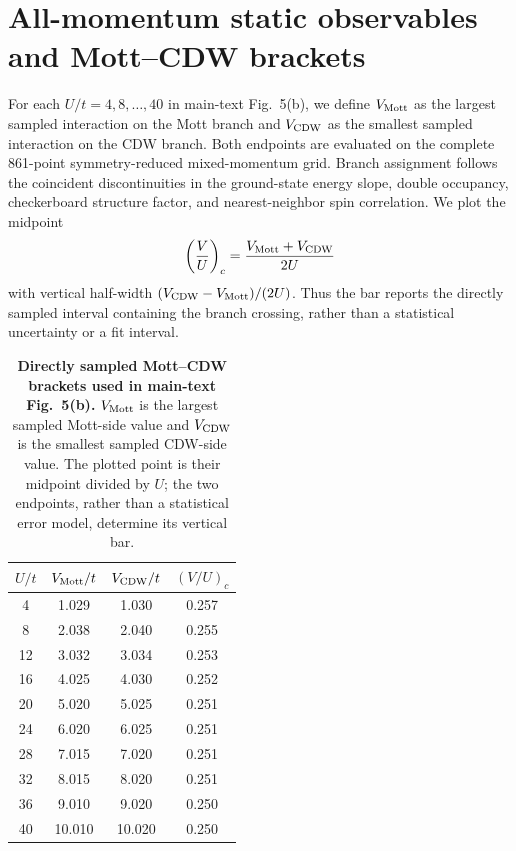 \documentclass[10pt]{article}
\begin{document}
\section{All-momentum static observables and Mott--CDW brackets}
For each $U/t=4,8,\ldots,40$ in main-text Fig.~5(b), we define $V_{\rm Mott}$ as the largest sampled interaction on the Mott branch and $V_{\rm CDW}$ as the smallest sampled interaction on the CDW branch. Both endpoints are evaluated on the complete 861-point symmetry-reduced mixed-momentum grid. Branch assignment follows the coincident discontinuities in the ground-state energy slope, double occupancy, checkerboard structure factor, and nearest-neighbor spin correlation. We plot the midpoint
\begin{equation}
 \left(\frac{V}{U}\right)_c=\frac{V_{\rm Mott}+V_{\rm CDW}}{2U}
\end{equation}
with vertical half-width $(V_{\rm CDW}-V_{\rm Mott})/(2U)$. Thus the bar reports the directly sampled interval containing the branch crossing, rather than a statistical uncertainty or a fit interval.

\begin{table}[H]
\centering
\caption{\textbf{Directly sampled Mott--CDW brackets used in main-text Fig.~5(b).} $V_{\rm Mott}$ is the largest sampled Mott-side value and $V_{\rm CDW}$ is the smallest sampled CDW-side value. The plotted point is their midpoint divided by $U$; the two endpoints, rather than a statistical error model, determine its vertical bar.}
\label{tab:transition-brackets-all-u}
\small
\begin{tabular}{cccc}
\toprule
$U/t$ & $V_{\rm Mott}/t$ & $V_{\rm CDW}/t$ & $(V/U)_c$ \\
\midrule
4  & 1.029  & 1.030  & 0.257 \\
8  & 2.038  & 2.040  & 0.255 \\
12 & 3.032  & 3.034  & 0.253 \\
16 & 4.025  & 4.030  & 0.252 \\
20 & 5.020  & 5.025  & 0.251 \\
24 & 6.020  & 6.025  & 0.251 \\
28 & 7.015  & 7.020  & 0.251 \\
32 & 8.015  & 8.020  & 0.251 \\
36 & 9.010  & 9.020  & 0.250 \\
40 & 10.010 & 10.020 & 0.250 \\
\bottomrule
\end{tabular}
\end{table}
\end{document}
